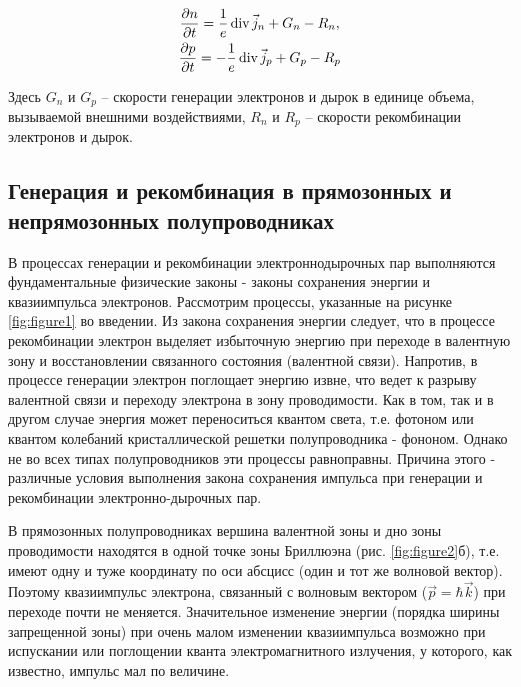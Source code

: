\begin{gather}
	\label{eq2}
	\frac{\partial n}{\partial t}=\frac{1}{e} \operatorname{div} \vec{j}_{n}+G_{n}-R_{n},\\ \nonumber
	\frac{\partial p}{\partial t}=-\frac{1}{e} \operatorname{div} \vec{j}_{p}+G_{p}-R_{p}
\end{gather}

Здесь $G_n$ и $G_p$ -- скорости генерации электронов и дырок в единице объема, вызываемой внешними воздействиями, $R_n$ и $R_p$ -- скорости рекомбинации электронов и дырок.

\subsection{Генерация и рекомбинация в прямозонных и непрямозонных полупроводниках}

В процессах генерации и рекомбинации электроннодырочных пар выполняются фундаментальные физические законы - законы
сохранения энергии и квазиимпульса электронов. Рассмотрим процессы, указанные на рисунке \ref{fig:figure1} во введении.
Из закона сохранения энергии следует, что в процессе рекомбинации электрон выделяет избыточную энергию при переходе в
валентную зону и восстановлении связанного состояния (валентной связи). Напротив, в процессе генерации электрон
поглощает энергию извне, что ведет к разрыву валентной связи и переходу электрона в зону проводимости. Как в том, так и
в другом случае энергия может переноситься квантом света, т.е. фотоном или квантом колебаний кристаллической решетки
полупроводника - фононом. Однако не во всех типах полупроводников эти процессы равноправны. Причина этого - различные
условия выполнения закона сохранения импульса при генерации и рекомбинации электронно-дырочных пар.

В прямозонных полупроводниках вершина валентной зоны и дно зоны проводимости находятся в одной точке зоны Бриллюэна
(рис.  \ref{fig:figure2}б), т.е. имеют одну и туже координату по оси абсцисс (один и тот же волновой вектор). Поэтому
квазиимпульс электрона, связанный с волновым вектором ($\vec{p}=\hbar \vec{k}$) при переходе почти не меняется.
Значительное изменение энергии (порядка ширины запрещенной зоны) при очень малом изменении квазиимпульса возможно при
испускании или поглощении кванта электромагнитного излучения, у которого, как известно, импульс мал по величине.

